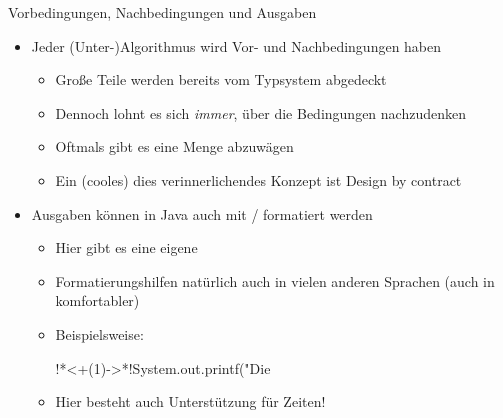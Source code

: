 \iffull
{\AddonFrame
\begin{frame}[fragile]{Vorbedingungen, Nachbedingungen und Ausgaben}
    \begin{itemize}[<+(1)->]
        \itemsep14pt
        \item Jeder (Unter-)Algorithmus wird Vor- und Nachbedingungen haben \begin{itemize}
            \item Große Teile werden bereits vom Typsystem abgedeckt
            \item Dennoch lohnt es sich \textit{immer}, über die Bedingungen nachzudenken
            \item Oftmals gibt es eine Menge abzuwägen
            \item Ein (cooles) dies verinnerlichendes Konzept ist Design by contract~\cite{meyer1986dbc,meyer1992applying}
        \end{itemize}
        \item Ausgaben können in Java auch mit / formatiert werden \begin{itemize}
            \item Hier gibt es eine eigene 
            \item Formatierungshilfen natürlich auch in vielen anderen Sprachen (auch in komfortabler)
            \item Beispielsweise:
\begin{plainjava}
!*\onslide<+(1)->*!System.out.printf("Die %
\end{plainjava}
            \item Hier besteht auch Unterstützung für Zeiten! 
        \end{itemize}
    \end{itemize}
\end{frame}
}\fi
\iffull
{}
